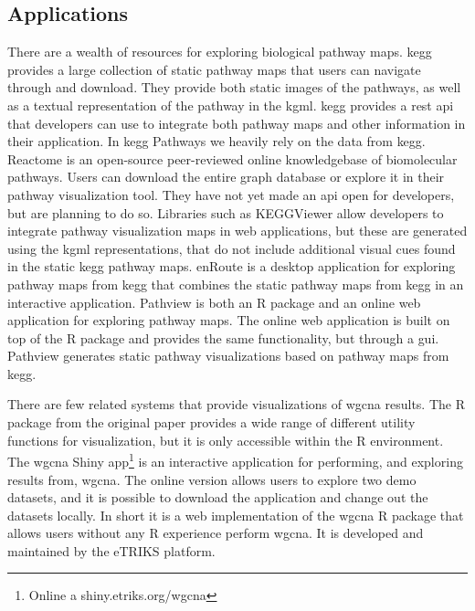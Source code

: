 \subsection{Applications} 
There are a wealth of resources for exploring biological pathway maps.
\gls{kegg} provides a large collection of static pathway maps that users
can navigate through and download.\cite{kegg} They provide both static images of
the pathways, as well as a textual representation of the pathway in the
\gls{kgml}.  \gls{kegg} provides a \gls{rest} \gls{api} that developers can use
to integrate both pathway maps and other information in their application. In
\gls{kegg} Pathways we heavily rely on the data from \gls{kegg}.  Reactome is an
open-source peer-reviewed online knowledgebase of biomolecular
pathways.\cite{fabregat2018reactome} Users can download the entire graph
database or explore it in their pathway visualization tool. They have not yet
made an \gls{api} open for developers, but are planning to do so. Libraries such
as KEGGViewer\cite{villaveces2014keggviewer} allow developers to integrate
pathway visualization maps in web applications, but these are generated using
the \gls{kgml} representations, that do not include additional visual cues found
in the static \gls{kegg} pathway maps.  enRoute\cite{partl2012enroute} is a
desktop application for exploring pathway maps from \gls{kegg} that combines the
static pathway maps from \gls{kegg} in an interactive application. Pathview is
both an R package and an online web application for exploring pathway
maps.\cite{luo2017pathview} The online web application is built on top of the R
package and provides the same functionality, but through a \gls{gui}. Pathview
generates static pathway visualizations based on pathway maps from \gls{kegg}. 

There are few related systems that provide visualizations of \gls{wgcna}
results. The R package from the original paper provides a wide range of
different utility functions for visualization, but it is only accessible within
the R environment.  The \gls{wgcna} Shiny app\footnote{Online a
shiny.etriks.org/wgcna} is an interactive application for performing, and
exploring results from, \gls{wgcna}.  The online version allows users to explore
two demo datasets, and it is possible to download the application and change out
the datasets locally. In short it is a web implementation of the \gls{wgcna} R
package that allows users without any R experience perform \gls{wgcna}. It is
developed and maintained by the eTRIKS platform.\cite{bussery2018etriks}

